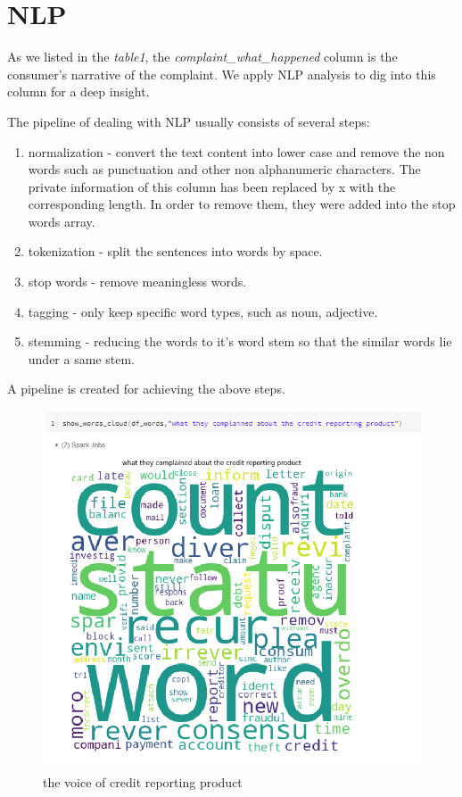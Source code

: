 \documentclass[conference]{IEEEtran}
\begin{document}
\section{NLP}\label{AA}
As we listed in the \textit{table1}, the  \textit{complaint\_what\_happened} column is the consumer's narrative of the complaint. We apply NLP analysis to dig into this column for a deep insight.

The pipeline of dealing with NLP usually consists of several steps:

\begin{enumerate}
\item normalization - convert the text content into lower case and remove the non words such as punctuation and other non alphanumeric characters.
The private information of this column has been replaced by x with the corresponding length. In order to remove them, they were added into the stop words array.
\item tokenization - split the sentences into words by space.
\item stop words - remove meaningless words.
\item tagging - only keep specific word types, such as noun, adjective.
\item stemming - reducing the words to it's word stem so that the similar words lie under a same stem.
\end{enumerate}

A pipeline is created for achieving the above steps.

\begin{figure}[h]
\centering
\includegraphics[width=0.9\linewidth]{img/word_cloud_reporting.png}
\caption{the voice of credit reporting product} \label{fig:wordcloudreporting}
\end{figure} 
\end{document}
